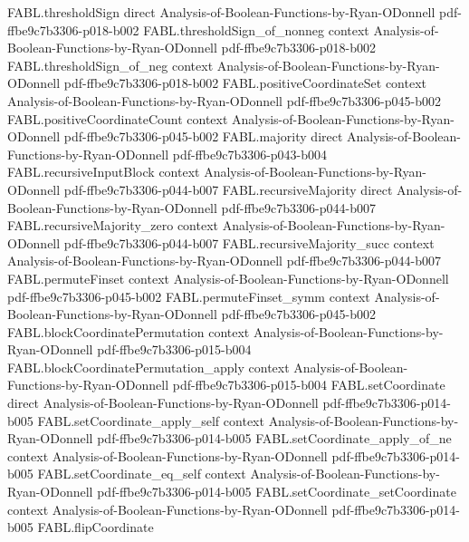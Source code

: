 \begin{theorem}
\proofstep
  {FABL.thresholdSign}
  {direct}
  {Analysis-of-Boolean-Functions-by-Ryan-ODonnell}
  {pdf-ffbe9c7b3306-p018-b002}
\proofstep
  {FABL.thresholdSign_of_nonneg}
  {context}
  {Analysis-of-Boolean-Functions-by-Ryan-ODonnell}
  {pdf-ffbe9c7b3306-p018-b002}
\proofstep
  {FABL.thresholdSign_of_neg}
  {context}
  {Analysis-of-Boolean-Functions-by-Ryan-ODonnell}
  {pdf-ffbe9c7b3306-p018-b002}
\proofstep
  {FABL.positiveCoordinateSet}
  {context}
  {Analysis-of-Boolean-Functions-by-Ryan-ODonnell}
  {pdf-ffbe9c7b3306-p045-b002}
\proofstep
  {FABL.positiveCoordinateCount}
  {context}
  {Analysis-of-Boolean-Functions-by-Ryan-ODonnell}
  {pdf-ffbe9c7b3306-p045-b002}
\proofstep
  {FABL.majority}
  {direct}
  {Analysis-of-Boolean-Functions-by-Ryan-ODonnell}
  {pdf-ffbe9c7b3306-p043-b004}
\proofstep
  {FABL.recursiveInputBlock}
  {context}
  {Analysis-of-Boolean-Functions-by-Ryan-ODonnell}
  {pdf-ffbe9c7b3306-p044-b007}
\proofstep
  {FABL.recursiveMajority}
  {direct}
  {Analysis-of-Boolean-Functions-by-Ryan-ODonnell}
  {pdf-ffbe9c7b3306-p044-b007}
\proofstep
  {FABL.recursiveMajority_zero}
  {context}
  {Analysis-of-Boolean-Functions-by-Ryan-ODonnell}
  {pdf-ffbe9c7b3306-p044-b007}
\proofstep
  {FABL.recursiveMajority_succ}
  {context}
  {Analysis-of-Boolean-Functions-by-Ryan-ODonnell}
  {pdf-ffbe9c7b3306-p044-b007}
\proofstep
  {FABL.permuteFinset}
  {context}
  {Analysis-of-Boolean-Functions-by-Ryan-ODonnell}
  {pdf-ffbe9c7b3306-p045-b002}
\proofstep
  {FABL.permuteFinset_symm}
  {context}
  {Analysis-of-Boolean-Functions-by-Ryan-ODonnell}
  {pdf-ffbe9c7b3306-p045-b002}
\proofstep
  {FABL.blockCoordinatePermutation}
  {context}
  {Analysis-of-Boolean-Functions-by-Ryan-ODonnell}
  {pdf-ffbe9c7b3306-p015-b004}
\proofstep
  {FABL.blockCoordinatePermutation_apply}
  {context}
  {Analysis-of-Boolean-Functions-by-Ryan-ODonnell}
  {pdf-ffbe9c7b3306-p015-b004}
\proofstep
  {FABL.setCoordinate}
  {direct}
  {Analysis-of-Boolean-Functions-by-Ryan-ODonnell}
  {pdf-ffbe9c7b3306-p014-b005}
\proofstep
  {FABL.setCoordinate_apply_self}
  {context}
  {Analysis-of-Boolean-Functions-by-Ryan-ODonnell}
  {pdf-ffbe9c7b3306-p014-b005}
\proofstep
  {FABL.setCoordinate_apply_of_ne}
  {context}
  {Analysis-of-Boolean-Functions-by-Ryan-ODonnell}
  {pdf-ffbe9c7b3306-p014-b005}
\proofstep
  {FABL.setCoordinate_eq_self}
  {context}
  {Analysis-of-Boolean-Functions-by-Ryan-ODonnell}
  {pdf-ffbe9c7b3306-p014-b005}
\proofstep
  {FABL.setCoordinate_setCoordinate}
  {context}
  {Analysis-of-Boolean-Functions-by-Ryan-ODonnell}
  {pdf-ffbe9c7b3306-p014-b005}
\proofstep
  {FABL.flipCoordinate}

\end{theorem}
